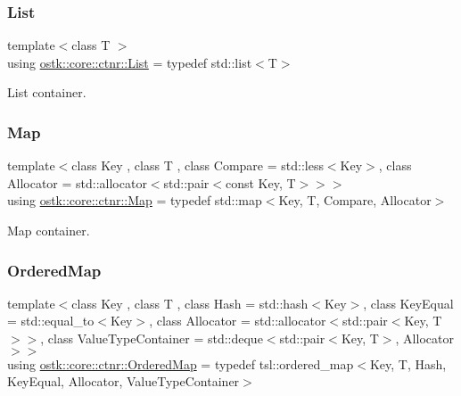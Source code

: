 \subsubsection{\texorpdfstring{List}{List}}
{\footnotesize\ttfamily template$<$class T $>$ \\
using \hyperlink{namespaceostk_1_1core_1_1ctnr_a5802e21d045076175dcb310a7045c858}{ostk\+::core\+::ctnr\+::\+List} = typedef std\+::list$<$T$>$}



List container. 

\mbox{\label{namespaceostk_1_1core_1_1ctnr_a2184a633cc52230b0617fab960393bc5}} 
\subsubsection{\texorpdfstring{Map}{Map}}
{\footnotesize\ttfamily template$<$class Key , class T , class Compare  = std\+::less$<$\+Key$>$, class Allocator  = std\+::allocator$<$std\+::pair$<$const Key, T$>$$>$$>$ \\
using \hyperlink{namespaceostk_1_1core_1_1ctnr_a2184a633cc52230b0617fab960393bc5}{ostk\+::core\+::ctnr\+::\+Map} = typedef std\+::map$<$Key, T, Compare, Allocator$>$}



Map container. 

\mbox{\label{namespaceostk_1_1core_1_1ctnr_a13ac23065e75eb425f38bfca4d0c6b38}} 
\subsubsection{\texorpdfstring{Ordered\+Map}{OrderedMap}}
{\footnotesize\ttfamily template$<$class Key , class T , class Hash  = std\+::hash$<$\+Key$>$, class Key\+Equal  = std\+::equal\+\_\+to$<$\+Key$>$, class Allocator  = std\+::allocator$<$std\+::pair$<$\+Key, T$>$$>$, class Value\+Type\+Container  = std\+::deque$<$std\+::pair$<$\+Key, T$>$, Allocator$>$$>$ \\
using \hyperlink{namespaceostk_1_1core_1_1ctnr_a13ac23065e75eb425f38bfca4d0c6b38}{ostk\+::core\+::ctnr\+::\+Ordered\+Map} = typedef tsl\+::ordered\+\_\+map$<$Key, T, Hash, Key\+Equal, Allocator, Value\+Type\+Container$>$}



